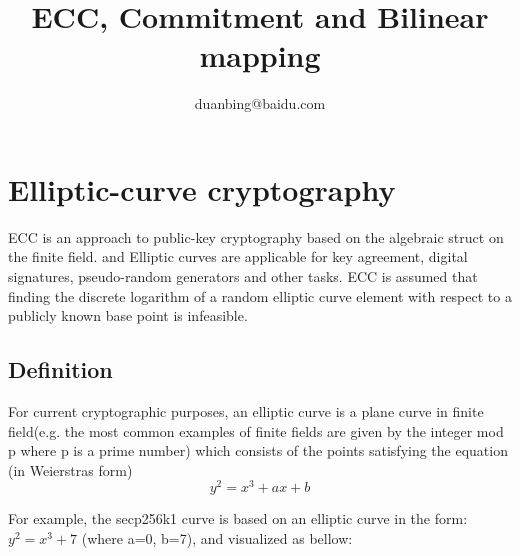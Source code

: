 \documentclass[a4paper,11pt]{article}
\author{duanbing@baidu.com}
\title{ECC, Commitment and Bilinear mapping}
\begin{document}
\maketitle  
\tableofcontents

\section{Elliptic-curve cryptography}
ECC  is an approach to public-key cryptography based on the algebraic struct on the finite field. and Elliptic curves are applicable for key agreement, digital signatures, pseudo-random generators and other tasks. ECC  is assumed that finding the discrete logarithm of a random elliptic curve element with respect to a publicly known base point is infeasible. 

\subsection {Definition}

For current cryptographic purposes, an elliptic curve is a plane curve in finite field(e.g. the most common examples of finite fields are given by the integer mod p where p is a prime number) which consists of the points satisfying the equation (in Weierstras form)
\begin{equation}
y^2 = x^3 + ax + b   \label{con:Weierstras}
\end{equation}

For example, the secp256k1 curve is based on an elliptic curve in the form: $y^2=x^3+7$ (where a=0, b=7), and visualized as bellow:
\end{document}
